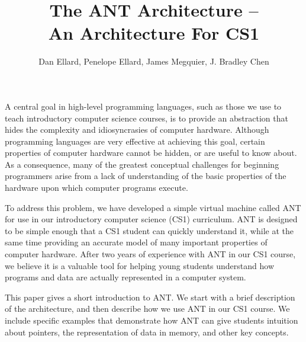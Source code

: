 %


\setlength{\textwidth}{6.0in}
\setlength{\oddsidemargin}{0.25in}
\setlength{\evensidemargin}{0.25in}
\raggedbottom


\title{The ANT Architecture -- \\ An Architecture For CS1}
\author{Dan Ellard, Penelope Ellard, James Megquier, J. Bradley Chen}
\date{}





\maketitle



A central goal in high-level programming languages, such as those we
use to teach introductory computer science courses, is to provide an
abstraction that hides the complexity and idiosyncrasies of computer
hardware. Although programming languages are very effective at
achieving this goal, certain properties of computer hardware cannot be
hidden, or are useful to know about.
As a consequence, many of the greatest conceptual challenges
for beginning programmers arise from a lack of understanding of the basic
properties of the hardware upon which computer programs execute.

To address this problem, we have developed a simple virtual machine
called ANT for use in our introductory computer science (CS1)
curriculum. ANT is designed to be simple enough that a CS1 student can
quickly understand it, while at the same time providing an accurate model of
many important properties of computer hardware. After two years of
experience with ANT in our CS1 course, we believe it is a valuable
tool for helping young students understand how programs and data are
actually represented in a computer system.

This paper gives a short introduction to ANT. We start with a brief
description of the architecture, and then describe how we use ANT in our
CS1 course. We include specific examples that demonstrate how ANT can
give students intuition about pointers, the representation of data in
memory, and other key concepts.

